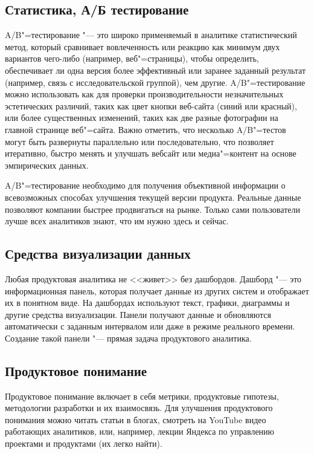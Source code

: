 \documentclass[referat, times]{SCWorks}
\begin{document}
\subsection{Статистика, А/Б тестирование}
A/B"=тестирование "--- это широко применяемый в аналитике
статистический метод, который сравнивает вовлеченность или реакцию как
минимум двух вариантов чего-либо (например, веб"=страницы), чтобы
определить, обеспечивает ли одна версия более эффективный или заранее
заданный результат (например, связь с исследовательской группой), чем
другие. A/B"=тестирование можно использовать как для проверки
производительности незначительных эстетических различий, таких как цвет
кнопки веб-сайта (синий или красный), или более существенных изменений,
таких как две разные фотографии на главной странице веб"=сайта. Важно
отметить, что несколько A/B"=тестов могут быть развернуты параллельно или
последовательно, что позволяет итеративно, быстро менять и улучшать вебсайт или медиа"=контент на основе эмпирических данных\cite{miller2021b}.

A/B"=тестирование необходимо для получения объективной информации
о всевозможных способах улучшения текущей версии продукта. Реальные
данные позволяют компании быстрее продвигаться на рынке. Только сами
пользователи лучше всех аналитиков знают, что им нужно здесь и сейчас\cite{ABtest}.

\subsection{Средства визуализации данных}
Любая продуктовая аналитика не <<живет>> без дашбордов. Дашборд "--- это информационная панель, которая получает данные из других систем и отображает их в понятном виде. На дашбордах используют текст, графики, диаграммы и другие средства визуализации. Панели получают данные и обновляются автоматически с заданным интервалом или даже в режиме реального времени. Создание такой панели "--- прямая задача продуктового аналитика.

\subsection{Продуктовое понимание}
Продуктовое понимание включает в себя метрики, продуктовые гипотезы, методологии разработки и их взаимосвязь.
Для улучшения продуктового понимания можно читать статьи в блогах, смотреть на YouTube видео работающих аналитиков, или, например, лекции Яндекса по управлению проектами и продуктами (их легко найти).
\end{document}
